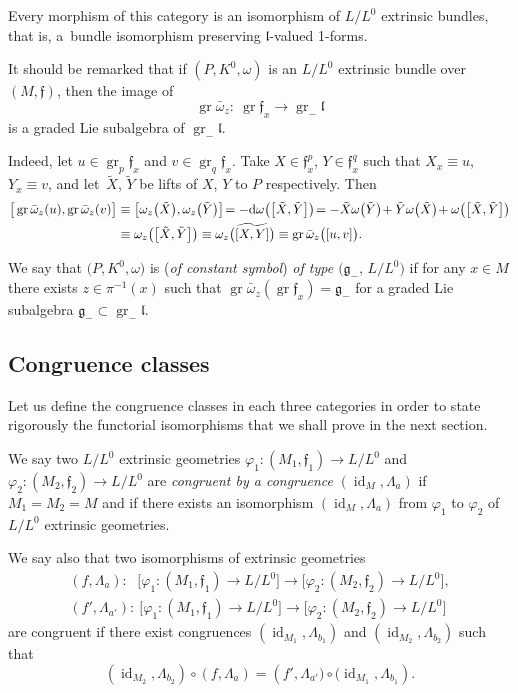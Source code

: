 \documentclass[pdftex]{sigma}%
\newcommand{\f}{\mathfrak f}
\newcommand{\g}{\mathfrak g}
\newcommand{\lf}{\mathfrak l}
\newcommand{\om}{\omega}
\newcommand{\id}{\operatorname{id}}
\newcommand{\gr}{\operatorname{gr}}
\numberwithin{equation}{section}
\begin{document}
Every morphism of this category is an isomorphism of $L/L^0$ extrinsic bundles, that is, a~bundle isomorphism preserving $\lf$-valued 1-forms.


It should be remarked that if $(P,K^0,\om)$ is an $L/L^0$ extrinsic bundle over $(M,\f)$, then the image of
\[
\gr \bar\om_z \colon\ \gr \f_x \to \gr_{-}\lf
\]
is a graded Lie subalgebra of $\gr_{-} \lf$.

Indeed, let $u\in \gr_p\f_x$ and $v\in \gr_q\f_x$. Take $X\in \f^p_x$, $Y\in \f^q_x$ such that $X_x\equiv u$, $Y_x\equiv v$, and let~$\tilde X$, $\tilde Y$ be lifts of $X$, $Y$ to $P$ respectively. Then
\begin{align*}
\big[\gr \bar\om_z(u), \gr \bar\om_z(v)\big] &\equiv \big[\om_z\big(\tilde X\big), \om_z\big(\tilde Y\big)\big]
\!= -{\rm d}\om\big(\big[\tilde X, \tilde Y\big]\big) \!= -\tilde X \om\big(\tilde Y\big) \!+\tilde Y \om \big(\tilde X\big)
\!+\om\big(\big[\tilde X,\tilde Y\big]\big)
\\
&\equiv \om_z\big(\big[\tilde X,\tilde Y\big]\big) \equiv \om_z\big(\widetilde{[X,Y]}\big) \equiv \gr \bar\om_z\big([u,v]\big).
\end{align*}


We say that $\big(P,K^0,\om\big)$ is (\emph{of constant symbol}) \emph{of type
	$\big(\g_-, \, L/L^0\big)$} if for any $x\in M$ there exists $z\in\pi^{-1}(x)$ such that $\gr\bar\om_z (\gr\f_x)=\g_{-}$ for a graded Lie subalgebra $\g_{-}\subset \gr_{-}\lf$.


\subsection{Congruence classes}

Let us define the congruence classes in each three categories in order to state rigorously the functorial isomorphisms that we shall prove in the next section.

We say two $L/L^0$ extrinsic geometries $\varphi_1\colon (M_1, \f_1)\to L/L^0$ and $\varphi_2 \colon (M_2, \f_2)\to L/L^0 $
are \emph{congruent by a congruence} $\left(\id_M, \Lambda_a\right)$
if $M_1 = M_2 = M$ and if there exists an isomorphism $\left(\id_M, \Lambda_a\right)$
from $\varphi_1$ to $\varphi_2$ of $L/L^0$ extrinsic geometries.

We say also that two isomorphisms of extrinsic geometries
\begin{gather*}
	(f, \Lambda_a)\colon\ \ \,\big[\varphi_1\colon (M_1, \f_1)\to L/L^0 \big]	\to
	\big[\varphi_2 \colon (M_2, \f_2)\to L/L^0 \big],
\\
	(f', \Lambda_{a'})\colon\ \big[\varphi_1\colon (M_1, \f_1)\to L/L^0 \big]	\to
	\big[\varphi_2 \colon (M_2, \f_2)\to L/L^0 \big]
\end{gather*}
are congruent if there exist congruences
$\left(\id_{M_1}, \Lambda_{b_1}\right)$ and $\left(\id_{M_2}, \Lambda_{b_2}\right)$
such that
\[
 \left(\id_{M_2}, \Lambda_{b_2}\right) \circ (f, \Lambda_a) = \left(f', \Lambda_{a'})\circ (\id_{M_1}, \Lambda_{b_1}\right)\!.
\]
\end{document}
